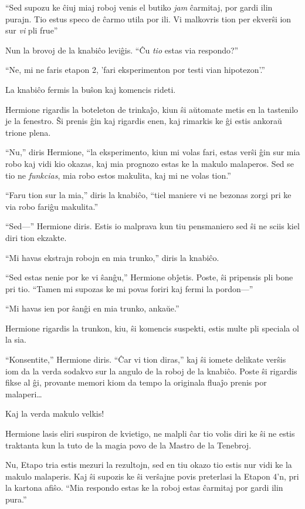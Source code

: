 ``Sed supozu ke ĉiuj miaj roboj venis el butiko \emph{jam} ĉarmitaj,
por gardi ilin purajn. Tio estus speco de ĉarmo utila por ili. Vi
malkovris tion per ekverŝi ion sur \emph{vi} pli frue''

Nun la brovoj de la knabiĉo leviĝis. ``Ĉu \emph{tio} estas via
respondo?''

``Ne, mi ne faris etapon 2, 'fari eksperimenton por testi vian
hipotezon'.''

La knabiĉo fermis la buŝon kaj komencis rideti.

Hermione rigardis la boteleton de trinkaĵo, kiun ŝi aŭtomate metis en
la tastenilo je la fenestro. Ŝi prenis ĝin kaj rigardis enen, kaj
rimarkis ke ĝi estis ankoraŭ trione plena.

``Nu,'' diris Hermione, ``la eksperimento, kiun mi volas fari, estas
verŝi ĝin sur mia robo kaj vidi kio okazas, kaj mia prognozo estas
ke la makulo malaperos. Sed se tio ne \emph{funkcias}, mia robo estos
makulita, kaj mi ne volas tion.''

``Faru tion sur la mia,'' diris la knabiĉo, ``tiel maniere vi ne
bezonas zorgi pri ke via robo fariĝu makulita.''

``Sed—'' Hermione diris. Estis io malprava kun tiu pensmaniero sed ŝi
ne sciis kiel diri tion ekzakte.

``Mi havas ekstrajn robojn en mia trunko,'' diris la knabiĉo.

``Sed estas nenie por ke vi ŝanĝu,'' Hermione obĵetis. Poste, ŝi
pripensis pli bone pri tio. ``Tamen mi supozas ke mi povas foriri kaj
fermi la pordon—''

``Mi havas ien por ŝanĝi en mia trunko, ankaŭe.''

Hermione rigardis la trunkon, kiu, ŝi komencis suspekti, estis multe
pli speciala ol la sia.

``Konsentite,'' Hermione diris. ``Ĉar vi tion diras,'' kaj ŝi iomete
delikate verŝis iom da la verda sodakvo sur la angulo de la roboj de
la knabiĉo. Poste ŝi rigardis fikse al ĝi, provante memori kiom da tempo
la originala fluaĵo prenis por malaperi\ldots

Kaj la verda makulo velkis!

Hermione lasis eliri suspiron de kvietigo, ne malpli ĉar tio volis
diri ke ŝi ne estis traktanta kun la tuto de la magia povo de la
Mastro de la Tenebroj.

Nu, Etapo tria estis mezuri la rezultojn, sed en tiu okazo tio estis
nur vidi ke la makulo malaperis. Kaj ŝi supozis ke ŝi verŝajne povis
preterlasi la Etapon 4'n, pri la kartona afiŝo. ``Mia respondo estas
ke la roboj estas ĉarmitaj por gardi ilin pura.''

